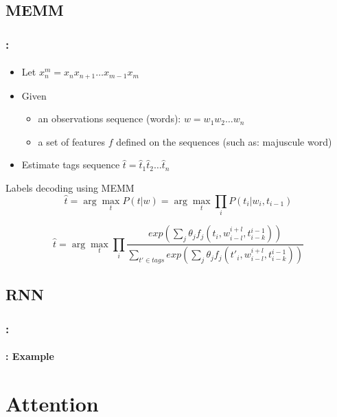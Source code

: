 \documentclass[xcolor=table]{beamer}
\begin{document}
\subsection{MEMM}

\begin{frame}
	\frametitle{\insertshortsubtitle: \insertsection}
	\framesubtitle{\insertsubsection}
	
	\begin{itemize}
		\item Let $x_{n}^{m} = x_n x_{n+1} \ldots x_{m-1} x_m$
		\item Given 
		\begin{itemize}
			\item an observations sequence (words): $w = w_1 w_2 \ldots w_n$
			\item a set of features $f$ defined on the sequences (such as: majuscule word)
		\end{itemize}
		\item Estimate tags sequence $\hat{t} = \hat{t}_1 \hat{t}_2 \ldots \hat{t}_n$
	\end{itemize}
	
	\begin{block}{Labels decoding using MEMM}
		\[
		\hat{t} = \arg\max\limits_t P(t | w) = \arg\max\limits_t \prod\limits_{i}  P(t_i | w_i, t_{i-1})
		\]
		
		\[
		\hat{t} = \arg\max\limits_t \prod\limits_{i}  
		\frac{exp\left(\sum_j \theta_j f_j(t_i, w_{i-l}^{i+l}, t_{i-k}^{i-1})\right)}%
		{\sum_{t' \in tags} exp\left(\sum_j \theta_j f_j(t'_i, w_{i-l}^{i+l}, t_{i-k}^{i-1})\right)}
		\]
	\end{block}
	
\end{frame}

\subsection{RNN}

\begin{frame}
	\frametitle{\insertshortsubtitle: \insertsection}
	\framesubtitle{\insertsubsection: Example}
	
	
\end{frame}
\section{Attention}
\end{document}
